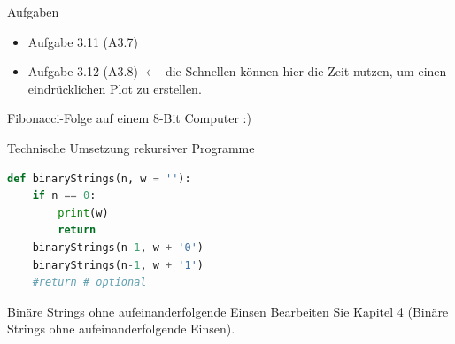 \begin{frame}[fragile]{Aufgaben}
\begin{itemize}
    \item Aufgabe 3.11 (A3.7)
    \item Aufgabe 3.12 (A3.8) $\leftarrow$ die Schnellen können hier die Zeit nutzen, um einen eindrücklichen Plot zu erstellen.
\end{itemize}
\end{frame}

\begin{frame}[fragile]{Fibonacci-Folge auf einem 8-Bit Computer :)}
\end{frame}

\begin{frame}[fragile]{Technische Umsetzung rekursiver Programme}
\begin{lstlisting}[language=Python]
def binaryStrings(n, w = ''):
    if n == 0:
        print(w)
        return
    binaryStrings(n-1, w + '0')
    binaryStrings(n-1, w + '1')
    #return # optional
\end{lstlisting}
\end{frame}

\begin{frame}[fragile]{Binäre Strings ohne aufeinanderfolgende Einsen}
Bearbeiten Sie Kapitel 4 (Binäre Strings ohne
aufeinanderfolgende Einsen).
\end{frame}